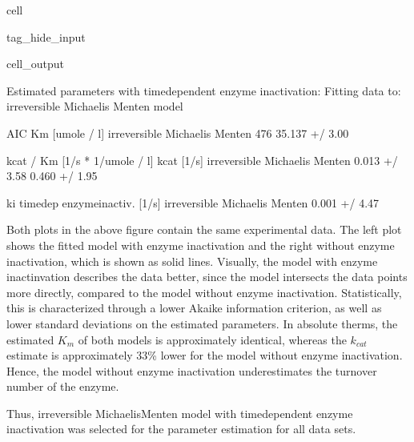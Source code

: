 \documentclass[letterpaper,10pt,english]{jupyterBook}
\begin{document}
\begin{sphinxuseclass}{cell}
\begin{sphinxuseclass}{tag_hide_input}
\begin{sphinxVerbatimOutput}
\begin{sphinxuseclass}{cell_output}
\begin{sphinxVerbatim}[commandchars=\\\{\}]
Estimated parameters with time\PYGZhy{}dependent enzyme inactivation:
Fitting data to:
 \PYGZhy{} irreversible Michaelis Menten model
\end{sphinxVerbatim}

\begin{sphinxVerbatim}[commandchars=\\\{\}]
                               AIC    Km [umole / l]  \PYGZbs{}
irreversible Michaelis Menten \PYGZhy{}476  35.137 +/\PYGZhy{} 3.00\PYGZpc{}   

                              kcat / Km [1/s * 1/umole / l]       kcat [1/s]  \PYGZbs{}
irreversible Michaelis Menten               0.013 +/\PYGZhy{} 3.58\PYGZpc{}  0.460 +/\PYGZhy{} 1.95\PYGZpc{}   

                              ki time\PYGZhy{}dep enzyme\PYGZhy{}inactiv. [1/s]  
irreversible Michaelis Menten                   0.001 +/\PYGZhy{} 4.47\PYGZpc{}  
\end{sphinxVerbatim}

\noindent{}

\end{sphinxuseclass}\end{sphinxVerbatimOutput}

\end{sphinxuseclass}
\end{sphinxuseclass}
\sphinxAtStartPar
Both plots in the above figure contain the same experimental data. The left plot shows the fitted model with enzyme inactivation and the right without enzyme inactivation, which is shown as solid lines. Visually, the model with enzyme inactinvation describes the data better, since the model intersects the data points more directly, compared to the model without enzyme inactivation. Statistically, this is characterized through a lower Akaike information criterion, as well as lower standard deviations on the estimated parameters.
In absolute therms, the estimated \(K_{m}\) of both models is approximately identical, whereas the \(k_{cat}\) estimate is approximately 33\% lower for the model without enzyme inactivation. Hence, the model without enzyme inactivation underestimates the turnover number of the enzyme.

\sphinxAtStartPar
Thus, irreversible Michaelis\sphinxhyphen{}Menten model with time\sphinxhyphen{}dependent enzyme inactivation was selected for the parameter estimation for all data sets.
\end{document}
